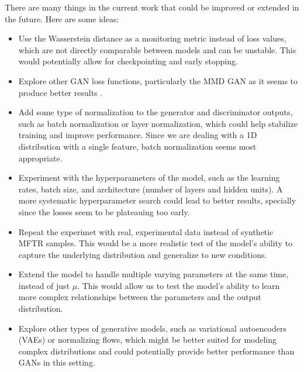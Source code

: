 There are many things in the current work that could be improved or extended in the future. Here are some ideas:
\begin{itemize}
    \item Use the Wasserstein distance as a monitoring metric instead of loss values, which are not directly comparable between models and can be unstable. This would potentially allow for checkpointing and early stopping.
    \item Explore other GAN loss functions, particularly the MMD GAN as it seems to produce better results \cite{zaheer2017gan}.
    \item Add some type of normalization to the generator and discriminator outputs, such as batch normalization or layer normalization, which could help stabilize training and improve performance. Since we are dealing with a 1D distribution with a single feature, batch normalization seems most appropriate.
    \item Experiment with the hyperparameters of the model, such as the learning rates, batch size, and architecture (number of layers and hidden units). A more systematic hyperparameter search could lead to better results, specially since the losses seem to be plateauing too early.
    \item Repeat the experimet with real, experimental data instead of synthetic MFTR samples. This would be a more realistic test of the model's ability to capture the underlying distribution and generalize to new conditions.
    \item Extend the model to handle multiple varying parameters at the same time, instead of just $\mu$. This would allow us to test the model's ability to learn more complex relationships between the parameters and the output distribution.
    \item Explore other types of generative models, such as variational autoencoders (VAEs) or normalizing flows, which might be better suited for modeling complex distributions and could potentially provide better performance than GANs in this setting.
\end{itemize}